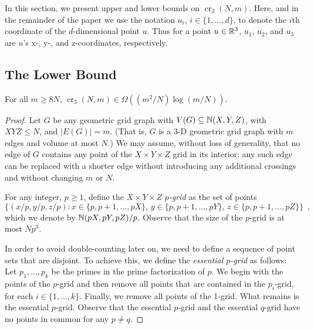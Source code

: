 \documentclass{patmorin}
\newcommand{\n}{N}
\DeclareMathOperator{\crs}{cr}
\begin{document}
In this section, we present upper and lower bounds on $\crs_3(\n,m)$.
Here, and in the remainder of the paper we use the notation
$u_i$, $i\in\{1,\ldots,d\}$, to denote the $i$th coordinate of the
$d$-dimensional point $u$.  Thus for a point $u\in\mathbb{R}^3$, $u_1$, $u_2$,
and $u_3$ are $u$'s x-, y-, and z-coordinates, respectively.

\subsection{The Lower Bound}


\begin{thm}
  For all $m\ge 8\n$, $\crs_3(\n,m) \in \Omega((m^2/\n)\log(m/\n))$.
\end{thm}

\begin{proof}
  Let $G$ be any geometric grid graph with $V(G)\subseteq\mathbb{N}(X,Y,Z)$,
  with $XYZ\le\n$, and $|E(G)|=m$. (That is, $G$ is a 3-D geometric
  grid graph with $m$ edges and volume at most $\n$.)  We may assume,
  without loss of generality, that no edge of $G$ contains any point
  of the $X\times Y\times Z$ grid in its interior; any such edge can
  be replaced with a shorter edge without introducing any additional
  crossings and without changing $m$ or $\n$.

  For any integer, $p\ge 1$, define the $X\times Y\times Z$
  \emph{$p$-grid} as the set of points
  \[
    \{(x/p,y/p,z/p): x\in\{p,p+1,\ldots,pX\},\,
    y\in\{p,p+1,\ldots,pY\},\, z\in\{p,p+1,\ldots,pZ\}\} \enspace ,
  \]
  which we denote by $\mathbb{N}(pX,pY,pZ)/p$.  Observe that the size of the
  $p$-grid is at most $\n p^3$.

  In order to avoid double-counting later on, we need to define a
  sequence of point sets that are disjoint.  To achieve this, we define
  the \emph{essential $p$-grid} as follows: Let $p_1,\ldots,p_k$ be the
  primes in the prime factorization of $p$.  We begin with the points
  of the $p$-grid and then remove all points that are contained in
  the $p_i$-grid, for each $i\in\{1,\ldots,k\}$.  Finally, we remove
  all points of the 1-grid.  What remains is the essential $p$-grid.
  Observe that the essential $p$-grid and the essential $q$-grid have no
  points in common for any $p\neq q$.

%
%


\end{proof}
\end{document}
